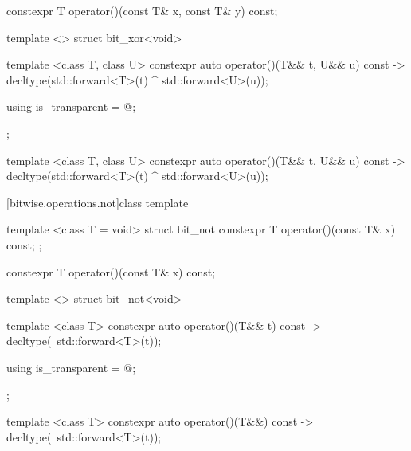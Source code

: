 %
\begin{itemdecl}
constexpr T operator()(const T& x, const T& y) const;
\end{itemdecl}

\begin{itemdescr}
\pnum\returns {}
\end{itemdescr}

%
\begin{itemdecl}
template <> struct bit_xor<void> {
  template <class T, class U> constexpr auto operator()(T&& t, U&& u) const
    -> decltype(std::forward<T>(t) ^ std::forward<U>(u));

  using is_transparent = @\unspec@;
};
\end{itemdecl}

%
\begin{itemdecl}
template <class T, class U> constexpr auto operator()(T&& t, U&& u) const
    -> decltype(std::forward<T>(t) ^ std::forward<U>(u));
\end{itemdecl}

\begin{itemdescr}
\pnum\returns {}
\end{itemdescr}

[bitwise.operations.not]{class template }

\begin{itemdecl}
template <class T = void> struct bit_not {
  constexpr T operator()(const T& x) const;
};
\end{itemdecl}

%
\begin{itemdecl}
constexpr T operator()(const T& x) const;
\end{itemdecl}

\begin{itemdescr}
\pnum\returns {}
\end{itemdescr}

%
\begin{itemdecl}
template <> struct bit_not<void> {
  template <class T> constexpr auto operator()(T&& t) const
    -> decltype(~std::forward<T>(t));

  using is_transparent = @\unspec@;
};
\end{itemdecl}

%
\begin{itemdecl}
template <class T> constexpr auto operator()(T&&) const
    -> decltype(~std::forward<T>(t));
\end{itemdecl}

